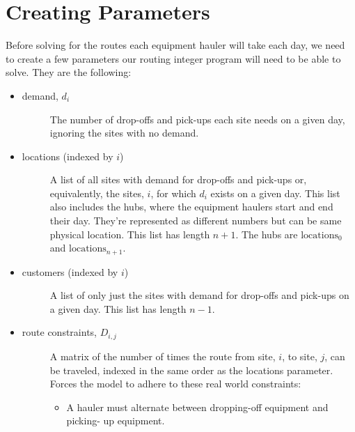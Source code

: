 \documentclass[letterpaper,10pt,english]{sphinxmanual}
\begin{document}
\section{Creating Parameters}
\label{\detokenize{daily-routing:creating-parameters}}
Before solving for the routes each equipment hauler will take each day, we
need to create a few parameters our routing integer program will need to be
able to solve. They are the following:
\begin{itemize}
\item {} \begin{description}
\item[{demand, \(d_{i}\)}] \leavevmode
The number of drop-offs and pick-ups each site needs on a given
day, ignoring the sites with no demand.

\end{description}

\item {} \begin{description}
\item[{locations (indexed by \(i\))}] \leavevmode
A list of all sites with demand for drop-offs and pick-ups or,
equivalently, the sites, \(i\), for which \(d_{i}\) exists on
a given day. This list also includes the hubs, where the equipment
haulers start and end their day. They're represented as different
numbers but can be same physical location. This list
has length \(n+1\). The hubs are \(\text{locations}_{0}\) and
\(\text{locations}_{n+1}\).

\end{description}

\item {} \begin{description}
\item[{customers (indexed by \(i\))}] \leavevmode
A list of only just the sites with demand for drop-offs and pick-ups
on a given day. This list has length \(n-1\).

\end{description}

\item {} \begin{description}
\item[{route constraints, \(D_{i,j}\)}] \leavevmode
A matrix of the number of times the route from site, \(i\), to
site, \(j\), can be traveled, indexed in the same order as the
locations parameter. Forces the model to adhere to these real world
constraints:
\begin{itemize}
\item {} 
A hauler must alternate between dropping-off equipment and picking-
up equipment.


\end{itemize}
\end{description}
\end{itemize}
\end{document}
